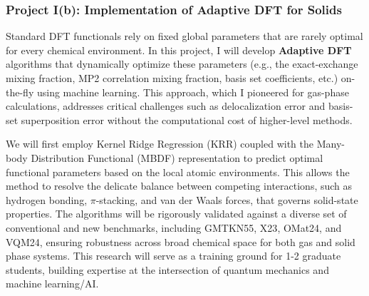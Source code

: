 \documentclass[11pt,letterpaper]{article}
\begin{document}

\subsubsection*{Project I(b): Implementation of Adaptive DFT for Solids}  

Standard DFT functionals rely on fixed global parameters that are rarely optimal for every chemical environment. In this project, I will develop \textbf{Adaptive DFT} algorithms that dynamically optimize these parameters (e.g., the exact-exchange mixing fraction, MP2 correlation mixing fraction, basis set coefficients, etc.) on-the-fly using machine learning. This approach, which I pioneered for gas-phase calculations\cite{apbe0}, addresses critical challenges such as delocalization error and basis-set superposition error without the computational cost of higher-level methods.

We will first employ Kernel Ridge Regression (KRR) coupled with the Many-body Distribution Functional (MBDF) representation\cite{mbdf,cmbdf} to predict optimal functional parameters based on the local atomic environments. This allows the method to resolve the delicate balance between competing interactions, such as hydrogen bonding, $\pi$-stacking, and van der Waals forces, that governs solid-state properties. The algorithms will be rigorously validated against a diverse set of conventional and new benchmarks, including GMTKN55\cite{gmtkn55}, X23\cite{x23}, OMat24\cite{omat24}, and VQM24\cite{vqm24}, ensuring robustness across broad chemical space for both gas and solid phase systems. This research will serve as a training ground for 1-2 graduate students, building expertise at the intersection of quantum mechanics and machine learning/AI. 
\end{document}
